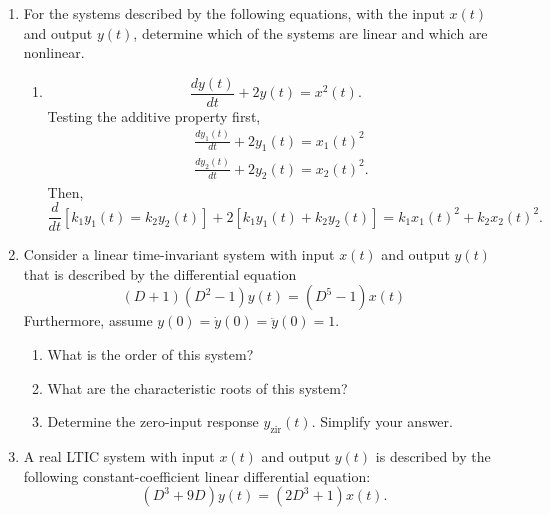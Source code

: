 \documentclass{article}
\begin{document}
\begin{enumerate}[label=\textbf{\thesubsubsection}]
\begin{enumerate}[label=\alph*)]
		\item Describe a simple change that can be made to the right-most delta function in \(x(t)\) so that \(y(t) = \int_{-\infty}^{t}x(\tau) \ d\tau\) has finite energy.
			Setting the coefficient of \(\delta(t)\) to \(0.5\) will "zero out" the function after \(t=4.\)
		\item Sketch \(z(t) = \int_{t}^{\infty}x(\tau) \ d\tau\).
		\item Determine real constants \(A\) and \(B\) so that \(w(t) = x(\frac{t-A}{B})\) has a region of support \([-2,2].\)
	\end{enumerate}
\setcounter{subsection}{7}
\setcounter{subsubsection}{1}
\item For the systems described by the following equations, with the input \(x(t)\) and output \(y(t)\), determine which of the systems are linear and which are nonlinear.
	\begin{enumerate}[label=\alph*)]
		\item \[\frac{dy(t)}{dt}+2y(t) = x^2(t).\]
			Testing the additive property first,
			\begin{align*}
				&\frac{dy_1(t)}{dt} + 2y_1(t) = x_1(t)^2 \\
				&\frac{dy_2(t)}{dt} + 2y_2(t) = x_2(t)^2.
			\end{align*}
			Then, 
			\[
				\frac{d}{dt}[k_1y_1(t) = k_2y_2(t)] + 2[k_1y_1(t) + k_2y_2(t)] = k_1x_1(t)^2 + k_2x_2(t)^2.
			\]
	\end{enumerate}
\setcounter{section}{2}
\setcounter{subsection}{2}
\setcounter{subsubsection}{2}
	\item Consider a linear time-invariant system with input \(x(t)\) and output \(y(t)\) that is described by the differential equation
		\[
			(D+1)(D^2-1){y(t)} = (D^5-1){x(t)}
		\]
		Furthermore, assume \(y(0) = \dot{y}(0) = \ddot{y}(0) = 1.\)
		\begin{enumerate}[label=(\alph*)]
			\item What is the order of this system?
				\vfill
			\item What are the characteristic roots of this system?
				\vfill 
			\item Determine the zero-input response \(y_{\mathrm{zir}}(t)\). Simplify your answer.
				\vfill
		\end{enumerate}
	\newpage
	\setcounter{subsubsection}{3}
	\item A real LTIC system with input \(x(t)\) and output \(y(t)\) is described by the following constant-coefficient linear differential equation:
		\[
			(D^3 + 9D){y(t)} = (2D^3 + 1){x(t)}.
\]
\end{enumerate}
\end{document}
